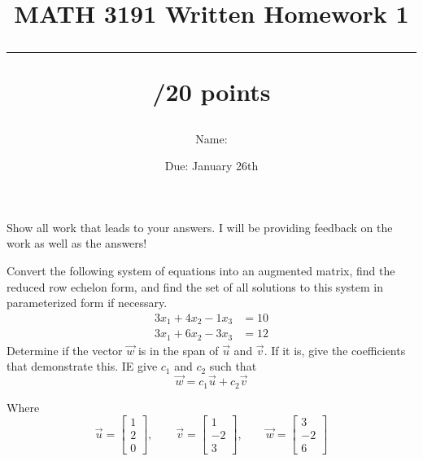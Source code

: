 \documentclass{exam}
\title{MATH 3191 Written Homework 1\\\rule{30pt}{1pt}/20 points}
\author{Name: \rule{150pt}{1pt}}
\date{Due: January 26th}
\begin{document}
\maketitle
Show all work that leads to your answers. I will be providing feedback on the work as well as the answers!
\begin{questions}
    \question[10] Convert the following system of equations into an augmented matrix, find the 
    reduced row echelon form, and find the set of all solutions to this system in parameterized form
    if necessary.
    \begin{align*}
        3x_1 + 4x_2 - 1x_3 &= 10 \\
        3x_1 + 6x_2 - 3x_3 &= 12
    \end{align*}
    \newpage
    \question[10] Determine if the vector $\vec{w}$ is in the span of $\vec{u}$ and $\vec{v}$. If
    it is, give the coefficients that demonstrate this. IE give $c_1$ and $c_2$ such that 
    $$\vec{w} = c_1\vec{u} + c_2\vec{v}$$

    Where 
    \[
        \vec{u} = \begin{bmatrix}
            1 \\
            2 \\
            0
        \end{bmatrix},\qquad
        \vec{v} = \begin{bmatrix}
            1 \\
            -2 \\
            3
        \end{bmatrix},\qquad
        \vec{w} = \begin{bmatrix}
            3 \\
            -2\\
            6
        \end{bmatrix}
    \]
\end{questions}
\end{document}

